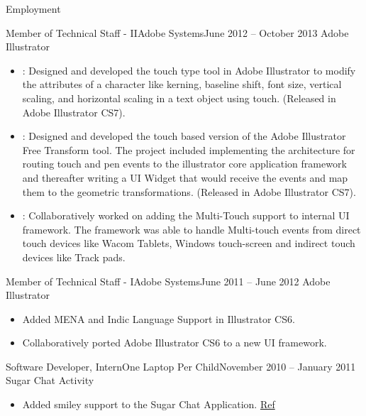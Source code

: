 \documentclass[]{mukeshcv}
\begin{document}
\begin{cvsection}{Employment}
\begin{cvsubsection}{Member of Technical Staff - II}{Adobe Systems}{June 2012 -- October 2013}
			Adobe Illustrator
			\begin{itemize}
				\item {}: Designed and developed the touch type tool in Adobe Illustrator to modify the attributes of a character like kerning, baseline shift, font size, vertical scaling, and horizontal scaling in a text object using touch. (Released in Adobe Illustrator CS7).
				\item {}: Designed and developed the touch based version of the Adobe Illustrator Free Transform tool. The project included implementing the architecture for routing touch and pen events to the illustrator core application framework and thereafter writing a UI Widget that would receive the events and map them to the geometric transformations. (Released in Adobe Illustrator CS7).
				\item {}: Collaboratively worked on adding the Multi-Touch support to internal UI framework. The framework was able to handle Multi-touch events from direct touch devices like Wacom Tablets, Windows touch-screen and indirect touch devices like Track pads.\\
			\end{itemize}
		\end{cvsubsection}
		\begin{cvsubsection}{Member of Technical Staff - I}{Adobe Systems}{June 2011 -- June 2012}
			Adobe Illustrator		
			\begin{itemize}
				\item Added MENA and Indic Language Support in Illustrator CS6.
				\item Collaboratively ported Adobe Illustrator CS6 to a new UI framework.
			\end{itemize}
		\end{cvsubsection}
		
		\begin{cvsubsection}{Software Developer, Intern}{One Laptop Per Child}{November 2010 -- January 2011}
			Sugar Chat Activity	
			\begin{itemize}
				\item Added smiley support to the Sugar Chat Application. \href{http://lists.sugarlabs.org/archive/sugar-devel/2010-December/029329.html}{Ref}
			\end{itemize}
		\end{cvsubsection}


\end{cvsection}
\end{document}
